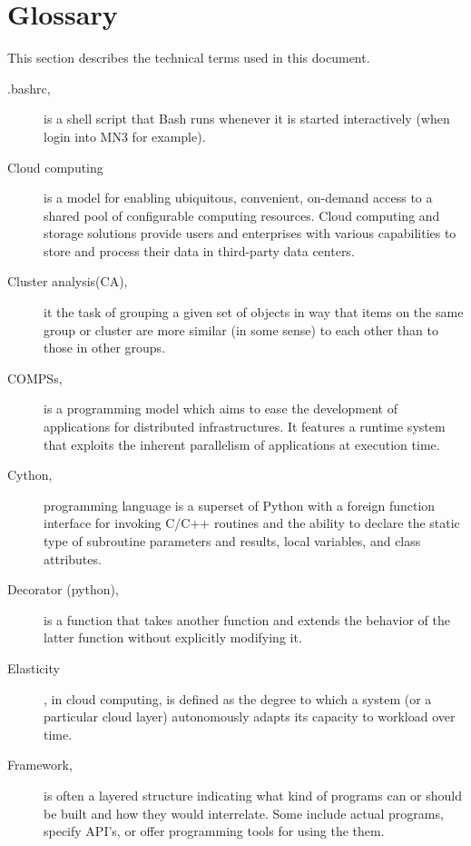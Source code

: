 \chapter{Glossary}

This section describes the technical terms used in this document. 

\label{sec:terms}

\begin{description}




\item [.bashrc,] is a shell script that Bash runs whenever it is started interactively (when login into MN3 for example).

\item [Cloud computing] is a model for enabling ubiquitous, convenient, on-demand access to a shared pool of configurable computing resources. Cloud computing and storage solutions provide users and enterprises with various capabilities to store and process their data in third-party data centers.

\item [Cluster analysis(CA), ] it the task of grouping a given set of objects in way that items on the same group or cluster are more similar (in some sense) to each other than to those in other groups. 

\item [COMPSs,] is a programming model which aims to ease the development of applications for distributed infrastructures. It features a runtime system that exploits the inherent parallelism of applications at execution time.

\item [Cython,] programming language is a superset of Python with a foreign function interface for invoking C/C++ routines and the ability to declare the static type of subroutine parameters and results, local variables, and class attributes.

\item [Decorator (python),] is a function that takes another function and extends the behavior of the latter function without explicitly modifying it.

\item [Elasticity], in cloud computing, is defined as the degree to which a system (or a particular cloud layer) autonomously adapts its capacity to workload over time.

\item[Framework,] is often a layered structure indicating what kind of programs can or should be built and how they would interrelate. Some include actual programs, specify API's, or offer programming tools for using the them.


\end{description}
